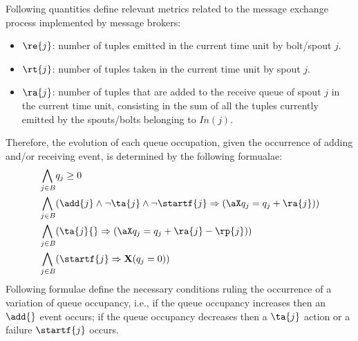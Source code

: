 Following quantities define relevant metrics related to the message exchange process implemented by message brokers:
\begin{itemize}
\item $\re{j}$: number of tuples emitted in the current time unit by bolt/spout $j$.
\item $\rt{j}$: number of tuples taken in the current time unit by spout $j$.
\item $\ra{j}$: number of tuples that are added to the receive queue of spout $j$ in the current time unit, consisting in the sum of all the tuples currently emitted by the spouts/bolts belonging to $In(j)$.
\end{itemize}
%
Therefore, the evolution of each queue occupation, given the occurrence of adding and/or receiving event, is determined by the following formualae:
%
\begin{align*}
\bigwedge_{
\begin{subarray}{c}
\,j \in B
\end{subarray}
} & q_j \geq  0\\ %
%
 \bigwedge_{
\begin{subarray}{c}
\,j \in B
\end{subarray}
} &( \add{j}  \wedge \lnot \ta{j}  \land \lnot \startf{j}
\Rightarrow (\aX q_j = q_j + \ra{j} ))\\ %
%
%
 \bigwedge_{
\begin{subarray}{c}
\,j \in B
\end{subarray}
} &( \ta{j}{}  \Rightarrow (\aX q_j = q_j + \ra{j} - \rp{j} )) \\%
%
%
%
%
%
%
 \bigwedge_{
\begin{subarray}{c}
\,j \in B
\end{subarray}
} &( \startf{j}
\Rightarrow \mathbf{X}( q_j = 0 ))
\end{align*}
%
Following formulae define the necessary conditions ruling the occurrence of a variation of queue occupancy, i.e., if the queue occupancy increases then an $\add{}$ event occurs; if the queue occupancy decreases then a $\ta{j}$ action or a failure  $\startf{j}$ occurs.
